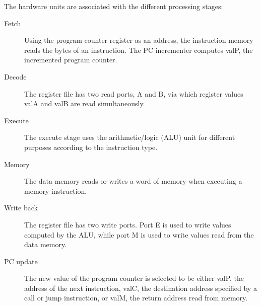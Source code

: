 \documentclass[11pt]{article}
\begin{document}
The hardware units are associated with the different processing stages:\\
\begin{description}
\item[{Fetch}] Using the program counter register as an address, the instruction memory reads the bytes of an instruction. The PC incrementer computes valP, the incremented program counter.\\
\item[{Decode}] The register file has two read ports, A and B, via which register values valA and valB are read simultaneously.\\
\item[{Execute}] The execute stage uses the arithmetic/logic (ALU) unit for different purposes according to the instruction type.\\
\item[{Memory}] The data memory reads or writes a word of memory when executing a memory instruction.\\
\item[{Write back}] The register file has two write ports. Port E is used to write values computed by the ALU, while port M is used to write values read from the data memory.\\
\item[{PC update}] The new value of the program counter is selected to be either valP, the address of the next instruction, valC, the destination address specified by a call or jump instruction, or valM, the return address read from memory.\\
\end{description}
\end{document}
